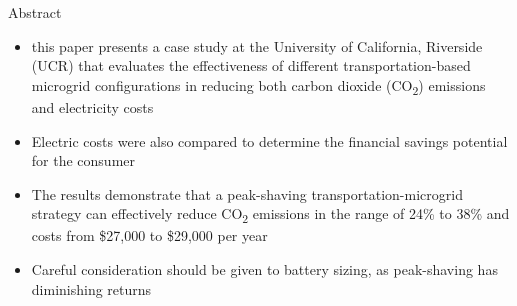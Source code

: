 \documentclass[final, 20 pt]{beamer}
\newlength{\onecolwid}
\begin{document}
\begin{frame}[t]
\begin{columns}[t]
\begin{column}{\onecolwid}

\begin{block}{Abstract}
	\begin{itemize}
		\item this paper presents a case study at the University of California, Riverside (UCR) that evaluates the effectiveness of different transportation-based microgrid configurations in reducing both carbon dioxide (CO\textsubscript{2}) emissions and electricity costs
		\item Electric costs were also compared to determine the financial savings potential for the consumer
		\item The results demonstrate that a peak-shaving transportation-microgrid strategy can effectively reduce CO\textsubscript{2} emissions in the range of 24\% to 38\% and costs from \$27,000 to \$29,000 per year
		\item  Careful consideration should be given to battery sizing, as peak-shaving has diminishing returns
	\end{itemize}
\end{block}


\end{column}
\end{columns}
\end{frame}
\end{document}
